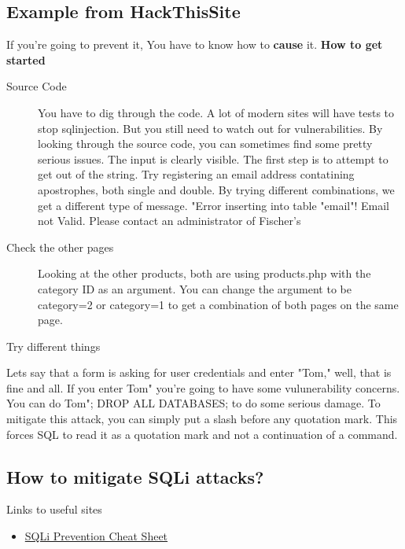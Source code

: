 \documentclass[a4paper, titlepage]{article}
\begin{document}
\subsection{Example from HackThisSite}
If you're going to prevent it, You have to know how to \textbf{cause} it.
\newline
\newline
\textbf{How to get started}
\begin{description}
   \item[Source Code] You have to dig through the code. A lot of modern sites will have tests to stop sqlinjection. But you still need to watch out for vulnerabilities. By looking through the source code, you can sometimes find some pretty serious issues. The input is clearly visible. The first step is to attempt to get out of the string. Try registering an email address contatining apostrophes, both single and double. By trying different combinations, we get a different type of message. "Error inserting into table "email"! Email not Valid. Please contact an administrator of Fischer's
    \item[Check the other pages] Looking at the other products, both are using products.php with the category ID as an argument. You can change the argument to be \?category=2 or category=1 to get a combination of both pages on the same page.
    \item[Try different things]
\end{description}


Lets say that a form is asking for user credentials and enter "Tom," well, that is fine and all. If you enter Tom" you're going to have some vulunerability concerns. You can do Tom"; DROP ALL DATABASES; to do some serious damage. To mitigate this attack, you can simply put a slash before any quotation mark. This forces SQL to read it as a quotation mark and not a continuation of a command.

\subsection{How to mitigate SQLi attacks?}
Links to useful sites
\begin{itemize}
    \item \href{https://www.owasp.org/index.php/SQL_Injection_Prevention_Cheat_Sheet}{SQLi Prevention Cheat Sheet}
\end{itemize}
\newpage

\end{document}

